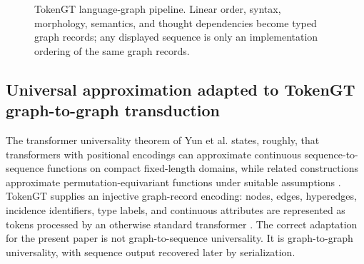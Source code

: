 \documentclass[11pt]{article}
\newcommand{\1}{\mathbf{1}}
\begin{document}
\begin{figure}[H]
\centering
{}
\caption{TokenGT language-graph pipeline. Linear order, syntax, morphology, semantics, and thought dependencies become typed graph records; any displayed sequence is only an implementation ordering of the same graph records.}
\label{fig:tokengt_language}
\end{figure}


\subsection{Universal approximation adapted to TokenGT graph-to-graph transduction}

The transformer universality theorem of Yun et al. states, roughly, that transformers with positional encodings can approximate continuous sequence-to-sequence functions on compact fixed-length domains, while related constructions approximate permutation-equivariant functions under suitable assumptions \cite{Yun2020}. TokenGT supplies an injective graph-record encoding: nodes, edges, hyperedges, incidence identifiers, type labels, and continuous attributes are represented as tokens processed by an otherwise standard transformer \cite{KimTokenGT2022}. The correct adaptation for the present paper is not graph-to-sequence universality. It is graph-to-graph universality, with sequence output recovered later by serialization.
\end{document}
